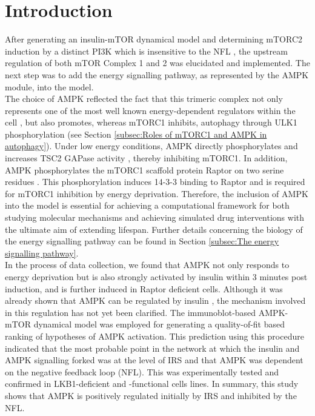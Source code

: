 \section{Introduction}
\label{paper2-sec:Introduction}
After generating an insulin-mTOR dynamical model and determining mTORC2 induction by a distinct PI3K which is insensitive to the NFL \citep{DallePezze2012a}, the upstream regulation of both mTOR Complex 1 and 2 was elucidated and implemented. The next step was to add the energy signalling pathway, as represented by the AMPK module, into the model. \\
The choice of AMPK reflected the fact that this trimeric complex not only represents one of the most well known energy-dependent regulators within the cell \citep{Thedieck2009}, but also promotes, whereas mTORC1 inhibits, autophagy through ULK1 phosphorylation \citep{Lee2010, Kim2011} (see Section \ref{subsec:Roles of mTORC1 and AMPK in autophagy}). Under low energy conditions, AMPK directly phosphorylates and increases TSC2 GAPase activity \citep{Inoki2003}, thereby inhibiting mTORC1. In addition, AMPK phosphorylates the mTORC1 scaffold protein Raptor on two serine residues \citep{Gwinn2008}. This phosphorylation induces 14-3-3 binding to Raptor and is required for mTORC1 inhibition by energy deprivation. Therefore, the inclusion of AMPK into the model is essential for achieving a computational framework for both studying molecular mechanisms and achieving simulated drug interventions with the ultimate aim of extending lifespan. Further details concerning the biology of the energy signalling pathway can be 
found in Section \ref{subsec:The energy signalling pathway}. \\
In the process of data collection, we found that AMPK not only responds to energy deprivation but is also strongly activated by insulin within 3 minutes post induction, and is further induced in Raptor deficient cells. Although it was already shown that AMPK can be regulated by insulin \citep{Suzuki2004, Polak2008, Aguilar2007}, the mechanism involved in this regulation has not yet been clarified. The immunoblot-based AMPK-mTOR dynamical model was employed for generating a quality-of-fit based ranking of hypotheses of AMPK activation. This prediction using this procedure indicated that the most probable point in the network at which the insulin and AMPK signalling forked was at the level of IRS and that AMPK was dependent on the negative feedback loop (NFL). This was experimentally tested and confirmed in LKB1-deficient and -functional cells lines. In summary, this study shows that AMPK is positively regulated initially by IRS and inhibited by the NFL.
